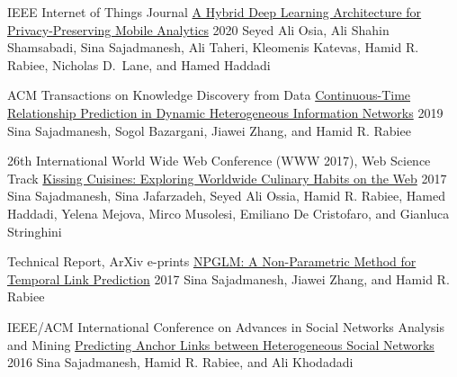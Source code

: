 \begin{cventries}
    
    \cventrypub
    {IEEE Internet of Things Journal}
    {\href{https://arxiv.org/abs/1703.02952}{A Hybrid Deep Learning Architecture for Privacy-Preserving Mobile Analytics}}
    {}
    {2020}
    {Seyed Ali Osia, Ali Shahin Shamsabadi, Sina Sajadmanesh, Ali Taheri, Kleomenis Katevas, Hamid R. Rabiee,
    Nicholas D.~Lane, and Hamed Haddadi}
    
    \cventrypub
    {ACM Transactions on Knowledge Discovery from Data}
    {\href{https://arxiv.org/abs/1710.00818}{Continuous-Time Relationship Prediction in Dynamic Heterogeneous Information Networks}}
    {}
    {2019}
    {Sina Sajadmanesh, Sogol Bazargani, Jiawei Zhang, and Hamid R. Rabiee}
    
    
    \cventrypub
    {26th International World Wide Web Conference (WWW 2017), Web Science Track}
    {\href{https://arxiv.org/abs/1610.08469}{Kissing Cuisines: Exploring Worldwide Culinary Habits on the Web}}
    {}
    {2017}
    {Sina Sajadmanesh, Sina Jafarzadeh, Seyed Ali Ossia, Hamid R. Rabiee, Hamed Haddadi, Yelena Mejova, Mirco Musolesi, Emiliano De Cristofaro, and Gianluca Stringhini}
    
    \cventrypub
    {Technical Report, ArXiv e-prints}
    {\href{https://arxiv.org/abs/1706.06783}{NPGLM: A Non-Parametric Method for Temporal Link Prediction}}
    {}
    {2017}
    {Sina Sajadmanesh, Jiawei Zhang, and Hamid R. Rabiee}
    
    \cventrypub
    {IEEE/ACM International Conference on Advances in Social Networks Analysis and Mining}
    {\href{https://arxiv.org/abs/1607.08821}{Predicting Anchor Links between Heterogeneous Social Networks}}
    {}
    {2016}
    {Sina Sajadmanesh, Hamid R. Rabiee, and Ali Khodadadi}
    
\end{cventries}
